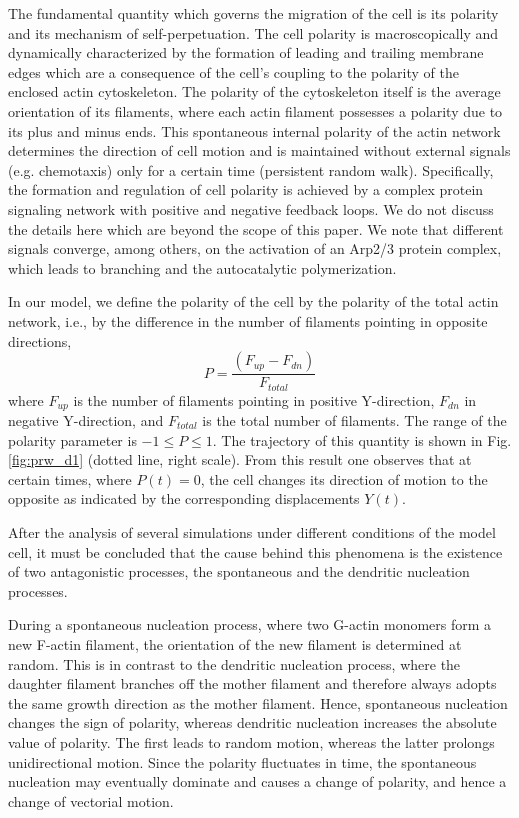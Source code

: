\documentclass[aps,preprint,pre,array,epsfig,eqsecnum]{revtex4}
\begin{document}
The fundamental quantity which governs the migration of the cell is its
polarity and its mechanism of self-perpetuation. 
%
The cell polarity is 
macroscopically and dynamically characterized by the
formation of leading and trailing membrane edges 
which are a consequence of the cell's coupling to the polarity of the 
enclosed actin cytoskeleton. 
The polarity of the cytoskeleton itself is the average orientation
of its filaments, where each actin filament possesses a polarity due to
its plus and minus ends.
%
This spontaneous internal polarity of the actin network
determines the direction of cell motion
and is maintained without external signals (e.g. chemotaxis) only for
a certain time (persistent random walk).
%
Specifically, the formation and regulation of cell polarity is achieved by
a complex protein signaling network with positive and negative feedback
loops. 
We do not discuss the details here which are 
beyond the scope of this paper. We note that different signals converge,
among others, on
the activation of an Arp2/3 protein complex, which leads to branching and 
the autocatalytic polymerization.

In our model, we define the polarity of the cell by the polarity of the total
actin network, i.e., 
by the difference 
in the number of filaments pointing in opposite directions,
\begin{equation}
     P = \frac{(F_{up}-F_{dn})}{F_{total}}     %
\end{equation}
where $F_{up}$ is the number of filaments pointing in 
positive Y-direction, $F_{dn}$ in negative Y-direction, and
$F_{total}$ is the total number of filaments.
The range of the polarity parameter is  $-1\le P \le 1$.
%
The trajectory of this quantity is shown
in Fig. \ref{fig:prw_d1} (dotted line, right scale). 
From this result one observes  
that at certain times, where $P(t) = 0$, 
the cell changes its direction of motion to the opposite as
indicated by the corresponding displacements $Y(t)$. 

After the analysis of several simulations under
different conditions of the model cell, it must be concluded that the  
cause behind this phenomena is the existence of two antagonistic processes, 
the spontaneous and the dendritic nucleation processes.

During a spontaneous
nucleation process, where two G-actin monomers form a new
F-actin filament, the orientation of the new filament is determined at random.
%
This is in contrast to the dendritic
nucleation process, where the daughter
filament branches off the mother filament and therefore
always adopts the same growth direction as the mother filament.
%
Hence, spontaneous nucleation changes the sign of polarity, whereas
dendritic nucleation increases the absolute value of polarity.
The first leads to random motion, whereas the latter prolongs 
unidirectional motion.
%
Since the polarity fluctuates in time, the spontaneous nucleation
may eventually dominate and causes a change of polarity, and hence
a change of vectorial motion.
\end{document}
